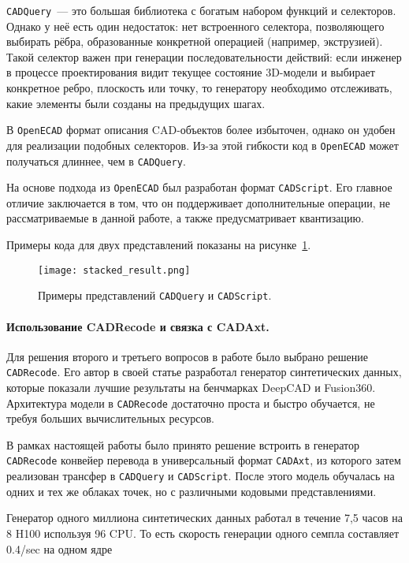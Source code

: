 \texttt{CADQuery}~— это большая библиотека с богатым набором функций и селекторов. Однако у неё есть
один недостаток: нет встроенного селектора, позволяющего выбирать рёбра, образованные конкретной
операцией (например, экструзией). Такой селектор важен при генерации последовательности действий:
если инженер в процессе проектирования видит текущее состояние 3D-модели и выбирает конкретное
ребро, плоскость или точку, то генератору необходимо отслеживать, какие элементы были созданы на предыдущих шагах.

В \texttt{OpenECAD} формат описания CAD-объектов более избыточен, однако он удобен для реализации
подобных селекторов. Из-за этой гибкости код в \texttt{OpenECAD} может получаться длиннее, чем в
\texttt{CADQuery}.

На основе подхода из \texttt{OpenECAD} был разработан формат \texttt{CADScript}. Его главное отличие
заключается в том, что он поддерживает дополнительные операции, не рассматриваемые в данной работе,
а также предусматривает квантизацию.

Примеры кода для двух представлений показаны на рисунке~\ref{fig:cadformats}.

\begin{figure}[h!]
    \centering
    \texttt{[image: stacked\_result.png]}
    \caption{Примеры представлений \texttt{CADQuery} и \texttt{CADScript}.}
    \label{fig:cadformats}
\end{figure}

\paragraph{Использование CADRecode и связка с CADAxt.}
Для решения второго и третьего вопросов в работе было выбрано решение
\texttt{CADRecode}. Его автор в своей статье разработал генератор синтетических
данных, которые показали лучшие результаты на бенчмарках DeepCAD и Fusion360.
Архитектура модели в \texttt{CADRecode} достаточно проста и быстро обучается,
не требуя больших вычислительных ресурсов.

В рамках настоящей работы было принято решение встроить в генератор
\texttt{CADRecode} конвейер перевода в универсальный формат \texttt{CADAxt}, из
которого затем реализован трансфер в \texttt{CADQuery} и
\texttt{CADScript}. После этого модель обучалась на одних и тех же облаках точек,
но с различными кодовыми представлениями.

Генератор одного миллиона синтетических данных работал в течение 7,5 часов на 8 H100
используя 96 CPU. То есть скорость генерации одного семпла составляет 0.4/sec на одном ядре

